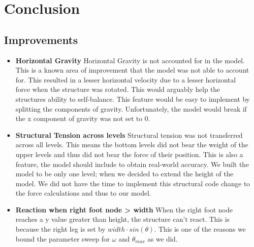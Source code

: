 \documentclass{article}
\begin{document}
\section{Conclusion}
\subsection{Improvements}
\begin{flushleft} 
\begin{itemize}
  \item \textbf{Horizontal Gravity} \newline
  \tabHorizontal Horizontal Gravity is not accounted for in the model. This is a known area of improvement that the model was not able to account for. This resulted in a lesser horizontal velocity due to a lesser horizontal force when the structure was rotated. This would arguably help the structures ability to self-balance. This feature would be easy to implement by splitting the components of gravity. Unfortunately, the model would break if the x component of gravity was not set to 0.
  \item \textbf{Structural Tension across levels} \newline
  \tabHorizontal Structural tension was not transferred across all levels. This means the bottom levels did not bear the weight of the upper levels and thus did not bear the force of their position. This is also a feature, the model should include to obtain real-world accuracy. We built the model to be only one level; when we decided to extend the height of the model. We did not have the time to implement this structural code change to the force calculations and thus to our model. 
  \item \textbf{Reaction when right foot node > width} \newline
  \tabHorizontal When the right foot node reaches a y value greater than height, the structure can't react. This is because the right leg is set by $width\cdot sin(\theta)$. This is one of the reasons we bound the parameter sweep for $\omega$ and $\theta_{max}$ as we did. 
\end{itemize}
\end{flushleft}
\end{document}
